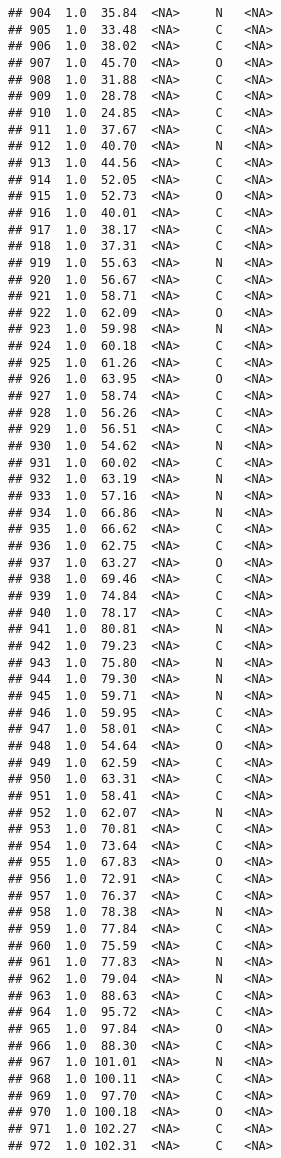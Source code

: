 \documentclass[
]{article}
\begin{document}
\begin{verbatim}
## 904  1.0  35.84  <NA>     N   <NA>
## 905  1.0  33.48  <NA>     C   <NA>
## 906  1.0  38.02  <NA>     C   <NA>
## 907  1.0  45.70  <NA>     O   <NA>
## 908  1.0  31.88  <NA>     C   <NA>
## 909  1.0  28.78  <NA>     C   <NA>
## 910  1.0  24.85  <NA>     C   <NA>
## 911  1.0  37.67  <NA>     C   <NA>
## 912  1.0  40.70  <NA>     N   <NA>
## 913  1.0  44.56  <NA>     C   <NA>
## 914  1.0  52.05  <NA>     C   <NA>
## 915  1.0  52.73  <NA>     O   <NA>
## 916  1.0  40.01  <NA>     C   <NA>
## 917  1.0  38.17  <NA>     C   <NA>
## 918  1.0  37.31  <NA>     C   <NA>
## 919  1.0  55.63  <NA>     N   <NA>
## 920  1.0  56.67  <NA>     C   <NA>
## 921  1.0  58.71  <NA>     C   <NA>
## 922  1.0  62.09  <NA>     O   <NA>
## 923  1.0  59.98  <NA>     N   <NA>
## 924  1.0  60.18  <NA>     C   <NA>
## 925  1.0  61.26  <NA>     C   <NA>
## 926  1.0  63.95  <NA>     O   <NA>
## 927  1.0  58.74  <NA>     C   <NA>
## 928  1.0  56.26  <NA>     C   <NA>
## 929  1.0  56.51  <NA>     C   <NA>
## 930  1.0  54.62  <NA>     N   <NA>
## 931  1.0  60.02  <NA>     C   <NA>
## 932  1.0  63.19  <NA>     N   <NA>
## 933  1.0  57.16  <NA>     N   <NA>
## 934  1.0  66.86  <NA>     N   <NA>
## 935  1.0  66.62  <NA>     C   <NA>
## 936  1.0  62.75  <NA>     C   <NA>
## 937  1.0  63.27  <NA>     O   <NA>
## 938  1.0  69.46  <NA>     C   <NA>
## 939  1.0  74.84  <NA>     C   <NA>
## 940  1.0  78.17  <NA>     C   <NA>
## 941  1.0  80.81  <NA>     N   <NA>
## 942  1.0  79.23  <NA>     C   <NA>
## 943  1.0  75.80  <NA>     N   <NA>
## 944  1.0  79.30  <NA>     N   <NA>
## 945  1.0  59.71  <NA>     N   <NA>
## 946  1.0  59.95  <NA>     C   <NA>
## 947  1.0  58.01  <NA>     C   <NA>
## 948  1.0  54.64  <NA>     O   <NA>
## 949  1.0  62.59  <NA>     C   <NA>
## 950  1.0  63.31  <NA>     C   <NA>
## 951  1.0  58.41  <NA>     C   <NA>
## 952  1.0  62.07  <NA>     N   <NA>
## 953  1.0  70.81  <NA>     C   <NA>
## 954  1.0  73.64  <NA>     C   <NA>
## 955  1.0  67.83  <NA>     O   <NA>
## 956  1.0  72.91  <NA>     C   <NA>
## 957  1.0  76.37  <NA>     C   <NA>
## 958  1.0  78.38  <NA>     N   <NA>
## 959  1.0  77.84  <NA>     C   <NA>
## 960  1.0  75.59  <NA>     C   <NA>
## 961  1.0  77.83  <NA>     N   <NA>
## 962  1.0  79.04  <NA>     N   <NA>
## 963  1.0  88.63  <NA>     C   <NA>
## 964  1.0  95.72  <NA>     C   <NA>
## 965  1.0  97.84  <NA>     O   <NA>
## 966  1.0  88.30  <NA>     C   <NA>
## 967  1.0 101.01  <NA>     N   <NA>
## 968  1.0 100.11  <NA>     C   <NA>
## 969  1.0  97.70  <NA>     C   <NA>
## 970  1.0 100.18  <NA>     O   <NA>
## 971  1.0 102.27  <NA>     C   <NA>
## 972  1.0 102.31  <NA>     C   <NA>

\end{verbatim}
\end{document}
